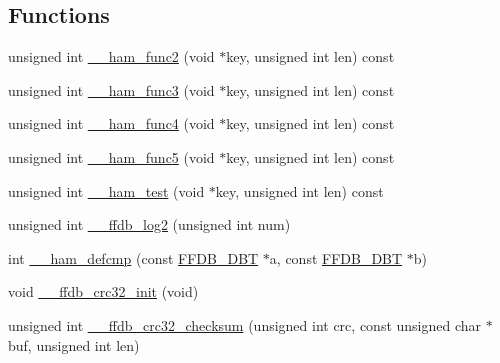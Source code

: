 \subsection*{Functions}
\begin{DoxyCompactItemize}
\item 
unsigned int \mbox{\hyperlink{adat-devel_2other__libs_2filedb_2filehash_2ffdb__hash__func_8c_a7baad926e039d464161868b2077d4605}{\+\_\+\+\_\+ham\+\_\+func2}} (void $\ast$key, unsigned int len) const
\item 
unsigned int \mbox{\hyperlink{adat-devel_2other__libs_2filedb_2filehash_2ffdb__hash__func_8c_a6bd76545445bde60a76f6290b7287d19}{\+\_\+\+\_\+ham\+\_\+func3}} (void $\ast$key, unsigned int len) const
\item 
unsigned int \mbox{\hyperlink{adat-devel_2other__libs_2filedb_2filehash_2ffdb__hash__func_8c_aae91cb0e3178660d77a99210d619cbef}{\+\_\+\+\_\+ham\+\_\+func4}} (void $\ast$key, unsigned int len) const
\item 
unsigned int \mbox{\hyperlink{adat-devel_2other__libs_2filedb_2filehash_2ffdb__hash__func_8c_a4e4944a1d277ba37eaa423ed3b33a589}{\+\_\+\+\_\+ham\+\_\+func5}} (void $\ast$key, unsigned int len) const
\item 
unsigned int \mbox{\hyperlink{adat-devel_2other__libs_2filedb_2filehash_2ffdb__hash__func_8c_a28296443e94e96a75b642a74b3709511}{\+\_\+\+\_\+ham\+\_\+test}} (void $\ast$key, unsigned int len) const
\item 
unsigned int \mbox{\hyperlink{adat-devel_2other__libs_2filedb_2filehash_2ffdb__hash__func_8c_a79d8cb8240ebb32c74ba51a0eac8aa64}{\+\_\+\+\_\+ffdb\+\_\+log2}} (unsigned int num)
\item 
int \mbox{\hyperlink{adat-devel_2other__libs_2filedb_2filehash_2ffdb__hash__func_8c_a84933d22e6744fb559a08e95010872e6}{\+\_\+\+\_\+ham\+\_\+defcmp}} (const \mbox{\hyperlink{adat-devel_2other__libs_2filedb_2filehash_2ffdb__db_8h_aa2e0984399491df0fdd20898ca8758f9}{F\+F\+D\+B\+\_\+\+D\+BT}} $\ast$a, const \mbox{\hyperlink{adat-devel_2other__libs_2filedb_2filehash_2ffdb__db_8h_aa2e0984399491df0fdd20898ca8758f9}{F\+F\+D\+B\+\_\+\+D\+BT}} $\ast$b)
\item 
void \mbox{\hyperlink{adat-devel_2other__libs_2filedb_2filehash_2ffdb__hash__func_8c_a7dd14a868e00186dc5b316ff25f1f85e}{\+\_\+\+\_\+ffdb\+\_\+crc32\+\_\+init}} (void)
\item 
unsigned int \mbox{\hyperlink{adat-devel_2other__libs_2filedb_2filehash_2ffdb__hash__func_8c_a2b68805bfc04d951c812e5deada76748}{\+\_\+\+\_\+ffdb\+\_\+crc32\+\_\+checksum}} (unsigned int crc, const unsigned char $\ast$buf, unsigned int len)
\end{DoxyCompactItemize}
